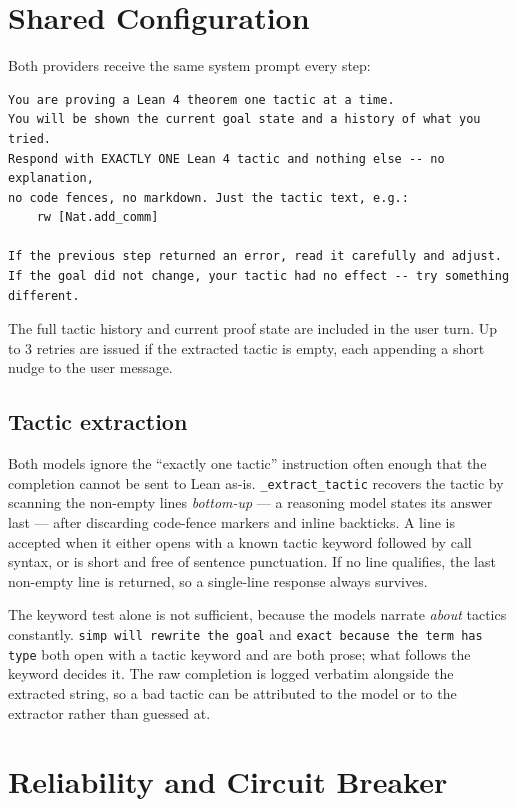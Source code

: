\section{Shared Configuration}

Both providers receive the same system prompt every step:

\begin{verbatim}
You are proving a Lean 4 theorem one tactic at a time.
You will be shown the current goal state and a history of what you tried.
Respond with EXACTLY ONE Lean 4 tactic and nothing else -- no explanation,
no code fences, no markdown. Just the tactic text, e.g.:
    rw [Nat.add_comm]

If the previous step returned an error, read it carefully and adjust.
If the goal did not change, your tactic had no effect -- try something different.
\end{verbatim}

The full tactic history and current proof state are included in the user turn.
Up to 3 retries are issued if the extracted tactic is empty, each appending a
short nudge to the user message.

\subsection{Tactic extraction}

Both models ignore the ``exactly one tactic'' instruction often enough that the
completion cannot be sent to Lean as-is. \texttt{\_extract\_tactic} recovers the
tactic by scanning the non-empty lines \emph{bottom-up} --- a reasoning model
states its answer last --- after discarding code-fence markers and inline
backticks. A line is accepted when it either opens with a known tactic keyword
followed by call syntax, or is short and free of sentence punctuation. If no
line qualifies, the last non-empty line is returned, so a single-line response
always survives.

The keyword test alone is not sufficient, because the models narrate
\emph{about} tactics constantly. \texttt{simp will rewrite the goal} and
\texttt{exact because the term has type} both open with a tactic keyword and
are both prose; what follows the keyword decides it. The raw completion is
logged verbatim alongside the extracted string, so a bad tactic can be
attributed to the model or to the extractor rather than guessed at.

\section{Reliability and Circuit Breaker}

